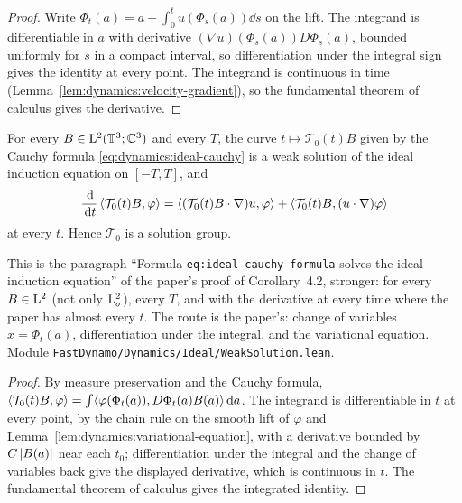 \begin{proof}
  \leanok
  Write $\Phi_t(a)=a+\int_0^tu(\Phi_s(a))\dd s$ on the lift.  The integrand is differentiable
  in $a$ with derivative $(\nabla u)(\Phi_s(a))D\Phi_s(a)$, bounded uniformly for $s$ in a
  compact interval, so differentiation under the integral sign gives the identity at every
  point.  The integrand is continuous in time
  (Lemma~\ref{lem:dynamics:velocity-gradient}), so the fundamental theorem of calculus gives
  the derivative.
\end{proof}

\begin{lemma}
  \label{lem:dynamics:ideal-weak-existence}
  \leanok
  For every $B\in\mathrm{L}^2(\mathbb{T}^3;\mathbb{C}^3)$ and every $T$, the curve $t\mapsto\mathcal T_0(t)B$ given
  by the Cauchy formula \eqref{eq:dynamics:ideal-cauchy} is a weak solution of the ideal
  induction equation on $[-T,T]$, and
  \[
    \frac{\,\mathrm{d}}{\,\mathrm{d} t}\left\langle\mathcal T_0(t)B,\varphi\right\rangle
    =\left\langle(\mathcal T_0(t)B\cdot\nabla)u,\varphi\right\rangle
    +\left\langle\mathcal T_0(t)B,(u\cdot\nabla)\varphi\right\rangle
  \]
  at every $t$.  Hence $\mathcal T_0$ is a solution group.
\end{lemma}

This is the paragraph ``Formula \texttt{eq:ideal-cauchy-formula} solves the ideal induction
equation'' of the paper's proof of Corollary~4.2, stronger: for every $B\in\mathrm{L}^2$ (not only
$\mathrm{L}^2_\sigma$), every $T$, and with the derivative at every time where the paper has almost
every $t$.  The route is the paper's: change of variables $x=\Phi_t(a)$, differentiation under
the integral, and the variational equation.  Module
\texttt{FastDynamo/Dynamics/Ideal/WeakSolution.lean}.

\begin{proof}
  \leanok
  By measure preservation and the Cauchy formula,
  $\left\langle\mathcal T_0(t)B,\varphi\right\rangle=\int\langle\varphi(\Phi_t(a)),D\Phi_t(a)B(a)\rangle\,\mathrm{d} a$.
  The integrand is differentiable in $t$ at every point, by the chain rule on the smooth lift
  of $\varphi$ and Lemma~\ref{lem:dynamics:variational-equation}, with a derivative bounded by
  $C\left\lvert B(a)\right\rvert$ near each $t_0$; differentiation under the integral and the change of
  variables back give the displayed derivative, which is continuous in $t$.  The fundamental
  theorem of calculus gives the integrated identity.
\end{proof}


